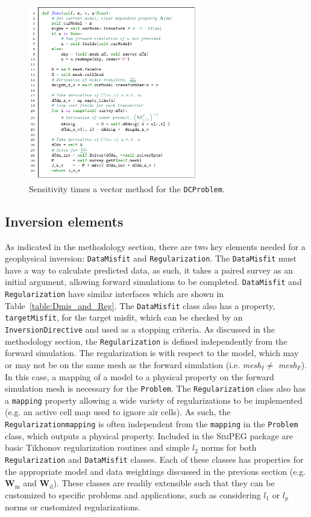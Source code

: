 \documentclass[preprint,review,3p,times,onecolumn,authoryear]{elsarticle}
\newcommand{\SimPEG}{\textsc{SimPEG}\xspace}
\newcommand{\Problem}{\texttt{Problem}\xspace}
\newcommand{\DCProblem}{\texttt{DCProblem}\xspace}
\newcommand{\Regularization}{\texttt{Regularization}\xspace}
\newcommand{\DataMisfit}{\texttt{DataMisfit}\xspace}
\newcommand{\meshI}{\emph{mesh}$_I$\xspace}
\newcommand{\meshF}{\emph{mesh}$_F$\xspace}
\newcommand{\Wd}{\mathbf{W}_\text{d}}
\newcommand{\Wm}{\mathbf{W}_\text{m}}
\begin{document}
{%
\begin{figure}[ht!]
\centering
\includegraphics[width=7.5cm]{DC_Jvec_function.pdf}
\caption{Sensitivity times a vector method for the \DCProblem.}
\label{fig:dcSensitivity}
\end{figure}
}


\subsection{Inversion elements}

As indicated in the methodology section, there are two key elements needed for
a geophysical inversion: \DataMisfit and \Regularization.
The \DataMisfit must have a way to calculate predicted data, as such, it takes a paired
survey as an initial argument, allowing forward simulations to be completed.
\DataMisfit and \Regularization have similar interfaces which are shown in Table~\ref{table:Dmis_and_Reg}.
The \DataMisfit class also has a property, \texttt{targetMisfit}, for the target misfit, which
can be checked by an \texttt{InversionDirective} and used as a stopping criteria.
As discussed in the methodology section, the \Regularization is defined independently
from the forward simulation. The regularization is with respect to the model, which may or may not be on the same mesh as the forward simulation (i.e. \meshI $\ne$ \meshF).
In this case, a mapping of a model to a physical property on the forward simulation mesh is necessary for the \Problem.
The \Regularization class also has a \texttt{mapping} property allowing a wide variety of regularizations to be implemented (e.g. an active cell map used to ignore air cells).
As such, the \Regularization \texttt{mapping} is often independent from the \texttt{mapping} in the \Problem class, which outputs a physical property.
Included in the \SimPEG package are basic Tikhonov regularization routines and simple
$l_2$ norms for both \Regularization and \DataMisfit classes.
Each of these classes has properties for the appropriate model and data weightings discussed in the previous section (e.g. $\Wm$ and $\Wd$).
These classes are readily extensible such that they can be customized to specific problems and applications, such as considering $l_1$ or $l_p$ norms or customized regularizations.
\end{document}
